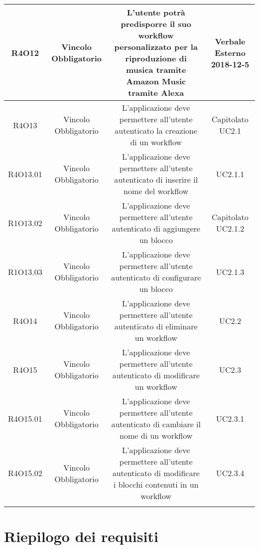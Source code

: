 \begin{tabularx}{\textwidth}{|C|C|C|C|}
	\hline
	R4O12&Vincolo Obbligatorio&L'utente potrà predisporre il suo workflow personalizzato per la riproduzione di musica tramite Amazon Music tramite Alexa& Verbale Esterno 2018-12-5 \\
	\hline
	R4O13&Vincolo Obbligatorio&L'applicazione deve permettere all'utente autenticato la creazione di un workflow& Capitolato UC2.1\\
	\hline
	R4O13.01&Vincolo Obbligatorio& L'applicazione deve permettere all'utente autenticato di inserire il nome del workflow  & UC2.1.1\\
	\hline
	R1O13.02&Vincolo Obbligatorio&L'applicazione deve permettere all'utente autenticato di aggiungere un blocco & Capitolato UC2.1.2\\
	\hline	
	R1O13.03&Vincolo Obbligatorio&L'applicazione deve permettere all'utente autenticato di configurare un blocco&UC2.1.3\\
	\hline
	R4O14&Vincolo Obbligatorio&L'applicazione deve permettere all'utente autenticato di eliminare un workflow&UC2.2\\
	\hline
	R4O15&Vincolo Obbligatorio& L'applicazione deve permettere all'utente autenticato di  modificare un workflow  &UC2.3\\
	\hline
	R4O15.01&Vincolo Obbligatorio& L'applicazione deve permettere all'utente autenticato di cambiare il nome di un workflow  &UC2.3.1\\
	\hline
	R4O15.02&Vincolo Obbligatorio& L'applicazione deve permettere all'utente autenticato di modificare i blocchi contenuti in un workflow  &UC2.3.4\\
	\hline
	\caption{Tabella requisiti di vincolo}
\end{tabularx}

\section{Riepilogo dei requisiti}

